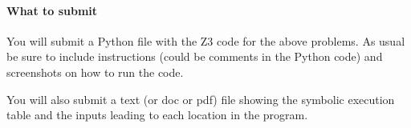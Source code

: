 \documentclass[oneside,11pt,dvipsnames]{book}
\begin{document}
\paragraph{What to submit} You will submit a Python file with the Z3 code for the above problems. As usual be sure to include instructions (could be comments in the Python code) and screenshots on how to run the code.

You will also submit a text (or doc or pdf) file showing the symbolic execution table and the inputs leading to each location in the program.



    
    

            
    
    
    
\end{document}
